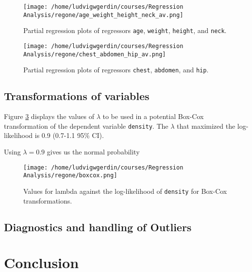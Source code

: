 \documentclass[11pt]{article}
\begin{document}
\begin{figure}[htbp]
\centering
\texttt{[image: /home/ludvigwgerdin/courses/Regression Analysis/regone/age\_weight\_height\_neck\_av.png]}
\caption{\label{fig:orgdf24c01}
Partial regression plots of regressors \texttt{age}, \texttt{weight}, \texttt{height}, and \texttt{neck}.}
\end{figure}

\begin{figure}[htbp]
\centering
\texttt{[image: /home/ludvigwgerdin/courses/Regression Analysis/regone/chest\_abdomen\_hip\_av.png]}
\caption{\label{fig:orgf3b22cc}
Partial regression plots of regressors \texttt{chest}, \texttt{abdomen}, and \texttt{hip}.}
\end{figure}
\subsection{Transformations of variables}
\label{sec:org01b98e7}

Figure \ref{fig:org272f1c2} displays the values of \(\lambda\) to be used in a potential Box-Cox transformation of 
the dependent variable \texttt{density}. The \(\lambda\) that maximized the log-likelihood is 0.9 (0.7-1.1 95\% CI). 

Using \(\lambda = 0.9\) gives us the normal probability 
\begin{figure}[h]
\centering
\texttt{[image: /home/ludvigwgerdin/courses/Regression Analysis/regone/boxcox.png]}
\caption{\label{fig:org272f1c2}
Values for lambda against the log-likelihood of \texttt{density} for Box-Cox transformations.}
\end{figure}

\subsection{Diagnostics and handling of Outliers}
\label{sec:org0e696ef}
\section{Conclusion}
\label{sec:org5be9bd6}


\end{document}
